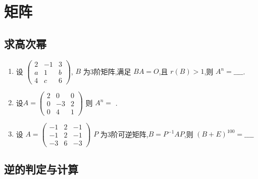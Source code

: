 \documentclass[12pt, a4paper, oneside, UTF8]{ctexbook}
\begin{document}
% 
\else
\fi

\chapter{矩阵}
\section{求高次幂}

\begin{enumerate}[label=\arabic*.]
    \item 设 $\left(\begin{array}{rrr}
        2&-1&3\\
        a&1&b\\
        4&c&6
    \end{array}\right)$,
    $ B $ 为3阶矩阵,满足 $ BA = O $,且 $ r(B) > 1 $,则 $ A^n =\_\_\_\_$.
    
    \begin{solution}
    \newpage
    \end{solution}
    \item 设$
    A = \begin{pmatrix}
    2 & 0 & 0 \\
    0 & -3 & 2 \\
    0 & 4 & 1
    \end{pmatrix}$
    则 $ A^n = $ \underline{\hspace{3cm}}.
    
    \begin{solution}
    \newpage
    \end{solution}
    
    \item 设
    $A = \begin{pmatrix}
    -1 & 2 & -1 \\
    -1 & 2 & -1 \\
    -3 & 6 & -3
    \end{pmatrix}$
    $ P $ 为3阶可逆矩阵,$ B = P^{-1}AP $,则 $ (B + E)^{100} =\_\_\_\_ $ 
    
    \begin{solution}
    \newpage
    \end{solution}
\end{enumerate}

\section{逆的判定与计算}
\end{document}

